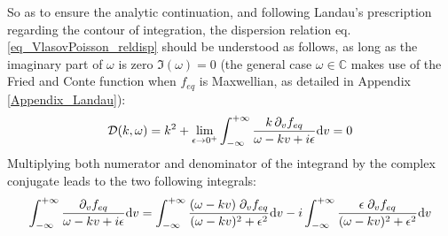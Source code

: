 \documentclass[11pt]{article}
\newcommand{\dd}{\textrm d}
\begin{document}
So as to ensure the analytic continuation, and following Landau's prescription regarding the contour of integration, the dispersion relation eq.\eqref{eq_VlasovPoisson_reldisp} should be understood as follows, as long as the imaginary part of $\omega$ is zero $\Im(\omega)=0$ (the general case $\omega\in\mathbb{C}$ makes use of the Fried and Conte function when $f_{eq}$ is Maxwellian, as detailed in Appendix \ref{Appendix_Landau}):
\begin{equation}
 \label{eq_VlasovPoisson_reldisp_new}
  \mathcal{D} (k,\omega)= k^2 + \lim_{\epsilon\to0^+}
  \int_{-\infty}^{+\infty}
  \frac{k\, \partial_v f_{eq}}{\omega - kv+i\epsilon} \dd v = 0
\end{equation}
Multiplying both numerator and denominator of the integrand by the complex conjugate leads to the two following integrals:
\begin{equation*}
 \int_{-\infty}^{+\infty} \frac{\partial_v f_{eq}}{\omega - kv+i\epsilon} \dd v =
 \int_{-\infty}^{+\infty}
 \frac{(\omega-kv)\;\partial_v f_{eq}}{(\omega - kv)^2+\epsilon^2} \dd v
 -i\int_{-\infty}^{+\infty}
 \frac{\epsilon\; \partial_v f_{eq}}{(\omega - kv)^2+\epsilon^2} \dd v
\end{equation*}
\end{document}
